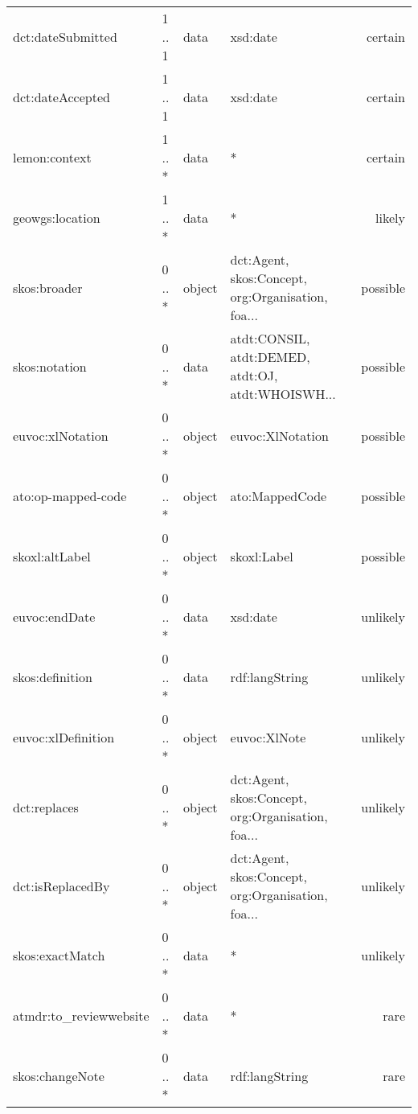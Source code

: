 \documentclass[10pt,a4paper,titlepage,final]{article}
\begin{document}
\begin{tabularx}{\textwidth}{lllXr}
      dct:dateSubmitted &      1 .. 1 &    data &                                           xsd:date &    certain \\
       dct:dateAccepted &      1 .. 1 &    data &                                           xsd:date &    certain \\
          lemon:context &      1 .. * &    data &                                                  * &    certain \\
        geowgs:location &      1 .. * &    data &                                                  * &     likely \\
           skos:broader &      0 .. * &  object &  dct:Agent, skos:Concept, org:Organisation, foa... &   possible \\
          skos:notation &      0 .. * &    data &  atdt:CONSIL, atdt:DEMED, atdt:OJ, atdt:WHOISWH... &   possible \\
       euvoc:xlNotation &      0 .. * &  object &                                   euvoc:XlNotation &   possible \\
     ato:op-mapped-code &      0 .. * &  object &                                     ato:MappedCode &   possible \\
         skoxl:altLabel &      0 .. * &  object &                                        skoxl:Label &   possible \\
          euvoc:endDate &      0 .. * &    data &                                           xsd:date &   unlikely \\
        skos:definition &      0 .. * &    data &                                     rdf:langString &   unlikely \\
     euvoc:xlDefinition &      0 .. * &  object &                                       euvoc:XlNote &   unlikely \\
           dct:replaces &      0 .. * &  object &  dct:Agent, skos:Concept, org:Organisation, foa... &   unlikely \\
       dct:isReplacedBy &      0 .. * &  object &  dct:Agent, skos:Concept, org:Organisation, foa... &   unlikely \\
        skos:exactMatch &      0 .. * &    data &                                                  * &   unlikely \\
 atmdr:to\_reviewwebsite &      0 .. * &    data &                                                  * &       rare \\
        skos:changeNote &      0 .. * &    data &                                     rdf:langString &       rare \\

\end{tabularx}
\end{document}
